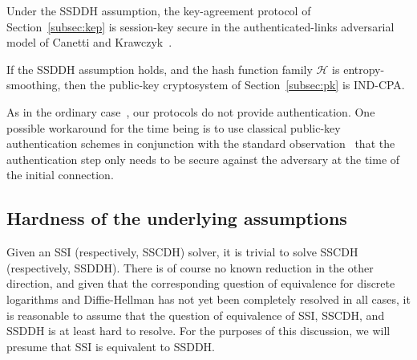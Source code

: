 \documentclass[envcountsect,envcountsame,runningheads]{llncs}   %
\begin{document}
\begin{theorem}\label{thm:kep-proof}
Under the SSDDH assumption, the key-agreement protocol of
Section~\ref{subsec:kep} is session-key secure in the
authenticated-links adversarial model of Canetti and
Krawczyk~\cite{canetti}.
\end{theorem}
\begin{theorem}\label{thm:pk-proof}
If the SSDDH assumption holds, and the hash function family
$\mathcal{H}$ is entropy-smoothing, then the public-key cryptosystem
of Section~\ref{subsec:pk} is IND-CPA.
\end{theorem}


\begin{remark}\label{rem:auth}
As in the ordinary case~\cite{R&S,Stol}, our protocols do not provide
authentication. One possible workaround for the time being
is to use classical public-key authentication schemes in conjunction
with the standard observation~\cite[\S 6.2]{sml09} that the
authentication step only needs to be secure against the adversary at the
time of the initial connection.
\end{remark}

\subsection{Hardness of the underlying
  assumptions}\label{subsec:hardness}

Given an SSI (respectively, SSCDH) solver, it is trivial to solve
SSCDH (respectively, SSDDH). There is of course no known reduction
in the other direction, and given that the corresponding question of
equivalence for
discrete logarithms and Diffie-Hellman has not yet been completely
resolved in all cases, it is reasonable
to assume that the question of equivalence of SSI, SSCDH, and SSDDH
is at least hard to resolve. For the purposes of this discussion, we
will presume that SSI is equivalent to SSDDH.
\end{document}

